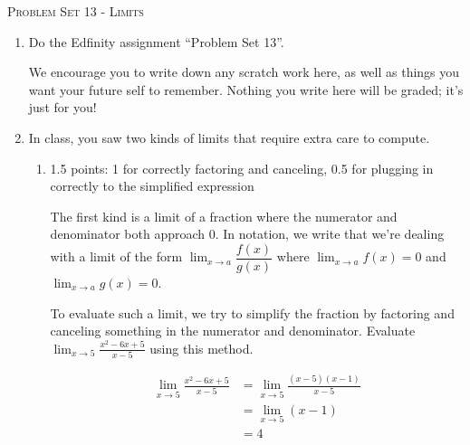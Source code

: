 \documentclass{article}
\newcommand{\doedfinity}[2][\newpage]{
  \begin{problem}[#1]
    Do the Edfinity assignment ``Problem Set #2''.

    We encourage you to write down any scratch work here, as well as
    things you want your future self to remember. Nothing you write
    here will be graded; it's just for you!
  \end{problem}
}
\begin{document}
\begin{center}
  \large\textsc{Problem Set 13 - Limits}
\end{center}

\begin{enumerate}
\item  {}

  \doedfinity{13}

\item \label{something-over-0-limits}

  In class, you saw two kinds of limits that require extra care to compute. 

  \begin{enumerate}
  \item

    \begin{grading}
      1.5 points: 1 for correctly factoring and canceling, 0.5 for plugging in correctly to the simplified expression 
    \end{grading}

    \begin{problem}[\stretch{5}]
      The first kind is a limit of a fraction where the numerator and denominator both approach 0. In notation, we write that we're dealing with a limit of the form $\displaystyle \lim_{x \to a} \dfrac{f(x)}{g(x)}$ where $\displaystyle \lim_{x \to a} f(x) = 0$ and $\displaystyle \lim_{x \to a} g(x) = 0$.

      To evaluate such a limit, we try to simplify the fraction by factoring and canceling something in the numerator and denominator. Evaluate $\displaystyle \lim_{x \to 5} \frac{x^2 - 6x + 5}{x - 5}$ using this method. 
    \end{problem}

    \begin{solution}
      \begin{align*}
        \lim_{x \to 5} \frac{x^2 - 6x +5}{x-5} &= \lim_{x \to 5} \frac{(x-5)(x-1)}{x-5} \\
        &= \lim_{x \to 5} (x-1) \\
        &= 4
      \end{align*}
    \end{solution}


\end{enumerate}
\end{enumerate}
\end{document}
